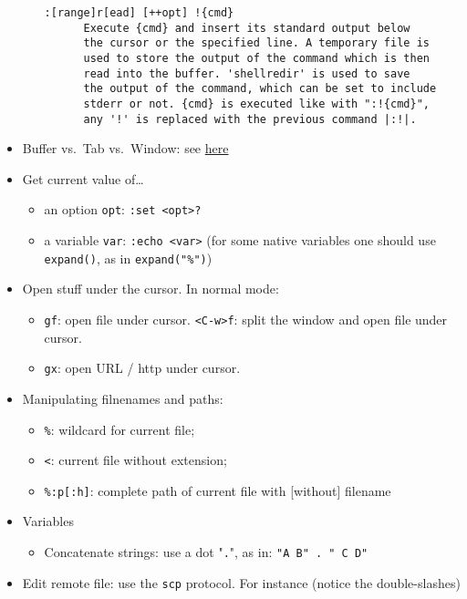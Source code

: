 \documentclass[a4paper,12pt,%
              final%
              ]{article}
\begin{document}
\begin{itemize}
\begin{itemize}
\begin{verbatim}
:[range]r[ead] [++opt] !{cmd}
      Execute {cmd} and insert its standard output below
      the cursor or the specified line. A temporary file is
      used to store the output of the command which is then
      read into the buffer. 'shellredir' is used to save
      the output of the command, which can be set to include
      stderr or not. {cmd} is executed like with ":!{cmd}",
      any '!' is replaced with the previous command |:!|.
\end{verbatim}
    \end{itemize}
  \item Buffer vs.~Tab vs.~Window: see
    \href{https://joshldavis.com/2014/04/05/vim-tab-madness-buffers-vs-tabs/}{here}
  \item Get current value of\ldots
    \begin{itemize}
      \item an option \verb|opt|: \verb|:set <opt>?|
      \item a variable \verb|var|: \verb|:echo <var>| (for some native variables one
        should use \verb|expand()|, as in \verb|expand("%")|)
    \end{itemize}
  \item Open stuff under the cursor. In normal mode:
    \begin{itemize}
      \item \texttt{gf}: open file under cursor. \texttt{<C-w>f}: split the window
        and open file under cursor.
      \item \texttt{gx}: open URL / http under cursor.
    \end{itemize}
  \item Manipulating filnenames and paths:
    \begin{itemize}
      \item \verb|%|: wildcard for current file;
      \item \verb|<|: current file without extension;
      \item \verb|%:p[:h]|: complete path of current file with [without] filename
    \end{itemize}
  \item Variables
    \begin{itemize}
      \item Concatenate strings: use a dot "\texttt{.}", as in: \verb|"A B" . " C D"|
    \end{itemize}
  \item Edit remote file: use the \texttt{scp} protocol. For instance (notice the
    double-slashes)

\end{itemize}
\end{document}
